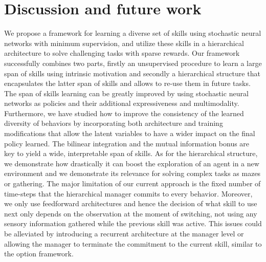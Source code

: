 \documentclass{article} %
\begin{document}
\section{Discussion and future work}
We propose a framework for learning a diverse set of skills using stochastic neural networks with minimum supervision, and utilize these skills in a hierarchical architecture to solve challenging tasks with sparse rewards. Our framework successfully combines two parts, firstly an unsupervised procedure to learn a large span of skills using intrinsic motivation and secondly a hierarchical structure that encapsulates the latter span of skills and allows to re-use them in future tasks. The span of skills learning can be greatly improved by using stochastic neural networks as policies and their additional expressiveness and multimodality. Furthermore, we have studied how to improve the consistency of the learned diversity of behaviors by incorporating both architecture and training modifications that allow the latent variables to have a wider impact on the final policy learned. The bilinear integration and the mutual information bonus are key to yield a wide, interpretable span of skills. As for the hierarchical structure, we demonstrate how drastically it can boost the exploration of an agent in a new environment and we demonstrate its relevance for solving complex tasks as mazes or gathering. The major limitation of our current approach is the fixed number of time-steps that the hierarchical manager commits to every behavior. Moreover, we only use feedforward architectures and hence the decision of what skill to use next only depends on the observation at the moment of switching, not using any sensory information gathered while the previous skill was active. This issues could be alleviated by introducing a recurrent architecture at the manager level or allowing the manager to terminate the commitment to the current skill, similar to the option framework.

\end{document}
